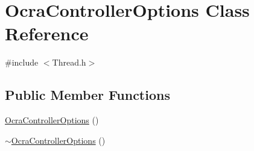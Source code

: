 \hypertarget{classOcraControllerOptions}{}\section{Ocra\+Controller\+Options Class Reference}
\label{classOcraControllerOptions}


{\ttfamily \#include $<$Thread.\+h$>$}

\subsection*{Public Member Functions}
\begin{DoxyCompactItemize}
\item 
\hyperlink{classOcraControllerOptions_a1a91de992c42c6da488e95cd594eca80}{Ocra\+Controller\+Options} ()
\item 
\hyperlink{classOcraControllerOptions_a22f514e92ccf91cc362c48a6c340ac19}{$\sim$\+Ocra\+Controller\+Options} ()
\end{DoxyCompactItemize}
